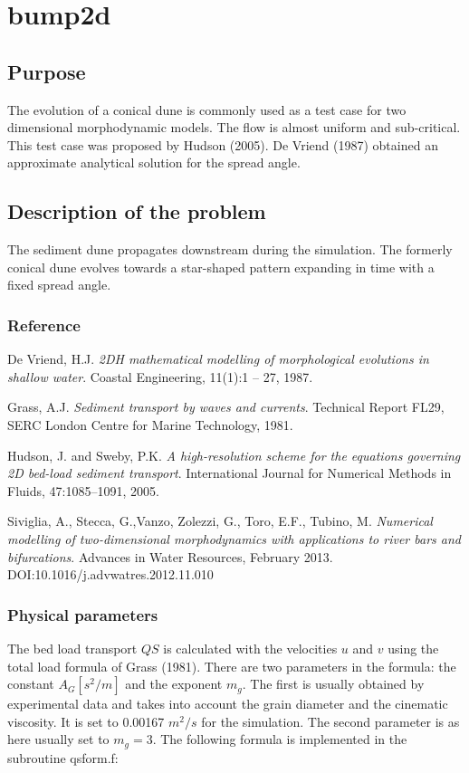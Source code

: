 \chapter{bump2d}
%

%
\section{Purpose}
The evolution of a conical dune  
is commonly used as a test case for 
two dimensional morphodynamic models. The flow is almost uniform and sub-critical.
This test case was proposed by Hudson (2005). De Vriend (1987) obtained an approximate
analytical solution for the spread angle.

%

%
\section{Description of the problem}
%
The sediment dune propagates downstream during the simulation. The formerly conical dune evolves towards a star-shaped pattern
expanding in time with a fixed spread angle. 


\subsection{Reference}

De Vriend, H.J. \textit{2DH mathematical modelling of morphological evolutions in
shallow water}. Coastal Engineering, 11(1):1 – 27, 1987.

Grass, A.J. \textit{Sediment transport by waves and currents}. Technical Report FL29,
SERC London Centre for Marine Technology, 1981.


Hudson, J. and Sweby, P.K. \textit{A high-resolution scheme for the equations
governing 2D bed-load sediment transport}. International Journal for Numerical
Methods in Fluids, 47:1085–1091, 2005.

Siviglia, A., Stecca, G.,Vanzo, Zolezzi, G., Toro, E.F., Tubino, M. \textit{Numerical modelling of two-dimensional
  morphodynamics with applications to river bars   and bifurcations}. Advances in Water Resources, February 2013. 
DOI:10.1016/j.advwatres.2012.11.010


\subsection{Physical parameters}
%
The bed load transport $QS$ is calculated with the velocities $u$ and $v$ 
using the total load formula of Grass (1981). 
There are two parameters in the formula: the constant $A_G [s^2/m]$ and the exponent $m_g$.
The first is usually obtained by experimental data and takes into account
the grain diameter and the cinematic viscosity. It is set to 0.00167 $m^2/s$ for the simulation.
The second parameter is as here usually set to $m_g=3$.
The following formula is implemented in the subroutine qsform.f:

